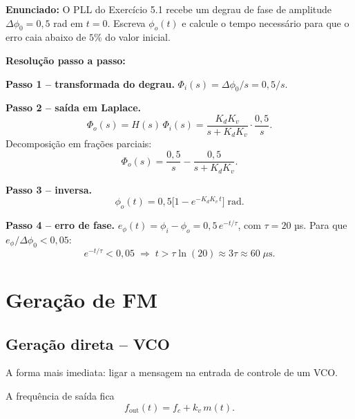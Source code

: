 \documentclass[11pt,a4paper]{article}
\newcommand{\FM}{\text{FM}}
\begin{document}
\begin{exercicio}
\textbf{Enunciado:} O PLL do Exercício 5.1 recebe um degrau de fase de amplitude $\Delta\phi_0=0{,}5$ rad em $t=0$. Escreva $\phi_o(t)$ e calcule o tempo necessário para que o erro caia abaixo de $5\%$ do valor inicial.

\textbf{Resolução passo a passo:}

\textbf{Passo 1 -- transformada do degrau.}
$\Phi_i(s) = \Delta\phi_0/s = 0{,}5/s$.

\textbf{Passo 2 -- saída em Laplace.}
\[
  \Phi_o(s) = H(s)\,\Phi_i(s) = \frac{K_d K_v}{s+K_d K_v}\cdot\frac{0{,}5}{s}.
\]
Decomposição em frações parciais:
\[
  \Phi_o(s) = \frac{0{,}5}{s} - \frac{0{,}5}{s+K_d K_v}.
\]

\textbf{Passo 3 -- inversa.}
\[
  \phi_o(t) = 0{,}5\bigl[1 - e^{-K_d K_v\,t}\bigr]\;\text{rad}.
\]

\textbf{Passo 4 -- erro de fase.}
$e_\phi(t) = \phi_i - \phi_o = 0{,}5\,e^{-t/\tau}$, com $\tau = 20$ µs. Para que $e_\phi/\Delta\phi_0 < 0{,}05$:
\[
  e^{-t/\tau} < 0{,}05 \;\Longrightarrow\; t > \tau\ln(20) \approx 3\tau \approx 60\;\mu\text{s}.
\]
\end{exercicio}

\section{Geração de FM}

\subsection{Geração direta -- VCO}

A forma mais imediata: ligar a mensagem na entrada de controle de um VCO.

\begin{center}
\end{center}

A frequência de saída fica
\[
  f_{\text{out}}(t) = f_c + k_v\,m(t).
\]
\end{document}
